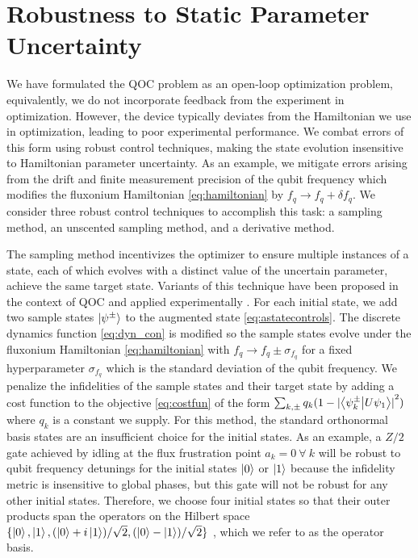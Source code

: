 \section{Robustness to Static Parameter Uncertainty \label{sec:static}}
We have formulated the QOC
problem as an open-loop optimization problem, equivalently,
we do not incorporate feedback from the experiment in optimization.
However, the device typically deviates from the Hamiltonian we use in optimization,
leading to poor experimental performance. We combat errors
of this form using robust control techniques,
making the state evolution insensitive
to Hamiltonian parameter uncertainty. As an example,
we mitigate errors arising from the drift and finite measurement
precision of the qubit frequency which modifies the fluxonium Hamiltonian
\eqref{eq:hamiltonian} by $f_{q} \rightarrow f_{q} + \delta f_{q}$.
We consider three robust control techniques to accomplish this task:
a sampling method, an unscented sampling method,
and a derivative method.

The sampling method incentivizes the optimizer
to ensure multiple instances of a state, each of which evolves
with a distinct value of the uncertain parameter, achieve
the same target state. Variants of this technique have been proposed
in the context of QOC
\cite{allen2019robust, ball2020software, khaneja2005optimal,
  reinhold2019controlling, rembold2020introduction} and applied
experimentally \cite{carvalho2020error}.
For each initial state,
we add two sample states $\ket{\psi^{\pm}}$
to the augmented state \eqref{eq:astatecontrols}. The discrete dynamics
function \eqref{eq:dyn_con} is modified
so the sample states evolve under the fluxonium Hamiltonian \eqref{eq:hamiltonian}
with $f_{q} \rightarrow f_{q} \pm \sigma_{f_{q}}$ for a fixed
hyperparameter $\sigma_{f_{q}}$ which is the standard deviation of the qubit frequency.
We penalize the infidelities of the sample states and their target state
by adding a cost function to the objective \eqref{eq:costfun} of the form
$\sum_{k, \pm} q_{k} (1 - {\lvert \braket{\psi^{\pm}_{k}}{U \psi_{1}} \rvert}^{2})$
where $q_{k}$ is a constant we supply.
For this method, the standard orthonormal basis states are an insufficient choice
for the initial states. As an example, a $Z/2$ gate achieved by idling
at the flux frustration point $a_{k} = 0 \ \forall \ k$
will be robust to qubit frequency detunings for the initial states $\ket{0}$
or $\ket{1}$ because the infidelity metric is insensitive to global phases,
but this gate will not be robust for any other initial states.
Therefore, we choose four initial states
so that their outer products
span the operators on the Hilbert space
$\{\ket{0}, \ket{1}, (\ket{0} + i\ket{1}) / \sqrt{2},
(\ket{0} - \ket{1}) / \sqrt{2}\}$ \cite{chow2009randomized},
which we refer to as the operator basis.

